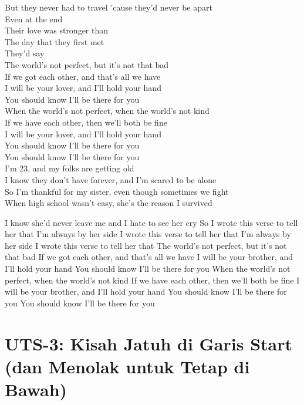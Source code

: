 \documentclass[
  letterpaper,
  DIV=11,
  numbers=noendperiod]{scrreprt}
\begin{document}
But they never had to travel 'cause they'd never be apart\\
Even at the end\\
Their love was stronger than\\
The day that they first met\\
They'd say\\
The world's not perfect, but it's not that bad\\
If we got each other, and that's all we have\\
I will be your lover, and I'll hold your hand\\
You should know I'll be there for you\\
When the world's not perfect, when the world's not kind\\
If we have each other, then we'll both be fine\\
I will be your lover, and I'll hold your hand\\
You should know I'll be there for you\\
You should know I'll be there for you\\
I'm 23, and my folks are getting old\\
I know they don't have forever, and I'm scared to be alone\\
So I'm thankful for my sister, even though sometimes we fight\\
When high school wasn't easy, she's the reason I survived

\textbar I know she'd never leave me and I hate to see her cry
\textbar So I wrote this verse to tell her that I'm always by her side
\textbar I wrote this verse to tell her that I'm always by her side
\textbar I wrote this verse to tell her that \textbar The world's not
perfect, but it's not that bad \textbar If we got each other, and that's
all we have \textbar I will be your brother, and I'll hold your hand
\textbar You should know I'll be there for you \textbar When the world's
not perfect, when the world's not kind \textbar{} If we have each other,
then we'll both be fine \textbar{} I will be your brother, and I'll hold
your hand \textbar{} You should know I'll be there for you \textbar{}
You should know I'll be there for you


\chapter{UTS-3: Kisah Jatuh di Garis Start (dan Menolak untuk Tetap di
Bawah)}\label{uts-3-kisah-jatuh-di-garis-start-dan-menolak-untuk-tetap-di-bawah}
\end{document}
